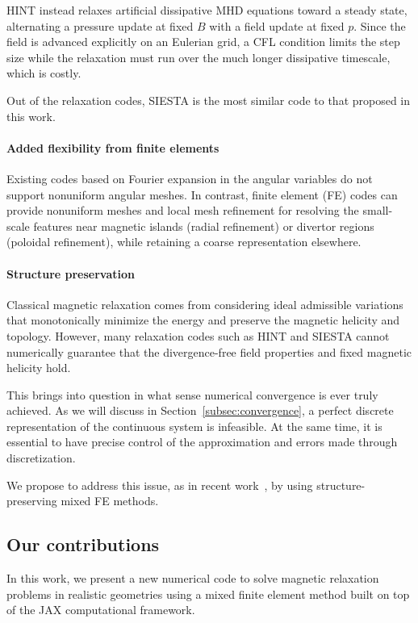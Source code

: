 \documentclass[%
 reprint,
 superscriptaddress,
 amsmath,amssymb,
 aps, nofootinbib, floatfix]{revtex4-2}
\begin{document}
HINT instead relaxes artificial dissipative MHD equations toward a steady state, alternating a pressure update at fixed $B$ with a field update at fixed $p$. Since the field is advanced explicitly on an Eulerian grid, a CFL condition limits the step size while the relaxation must run over the much longer dissipative timescale, which is costly.

Out of the relaxation codes, SIESTA is the most similar code to that proposed in this work.

\paragraph{Added flexibility from finite elements}
Existing codes based on Fourier expansion in the angular variables do not support nonuniform angular meshes. In contrast, finite element (FE) codes can provide nonuniform meshes and local mesh refinement for resolving the small-scale features near magnetic islands (radial refinement) or divertor regions (poloidal refinement), while retaining a coarse representation elsewhere.

\paragraph{Structure preservation}
Classical magnetic relaxation comes from considering ideal admissible variations that monotonically minimize the energy and preserve the magnetic helicity and topology. However, many relaxation codes such as HINT and SIESTA cannot {numerically} guarantee that the divergence-free field properties and fixed magnetic helicity hold.

This brings into question in what sense numerical convergence is ever truly achieved. As we will discuss in Section~\ref{subsec:convergence}, a perfect discrete representation of the continuous system is infeasible. At the same time, it is essential to have precise control of the approximation and errors made through discretization.

We propose to address this issue, as in recent work~\citep{bressan_2023_relaxation, he_topology-preserving_2025}, by using structure-preserving mixed FE methods.

\subsection{Our contributions}
\label{subsec:contributions}
In this work, we present a new numerical code to solve magnetic relaxation problems in realistic geometries using a mixed finite element method built on top of the JAX computational framework.
\end{document}
